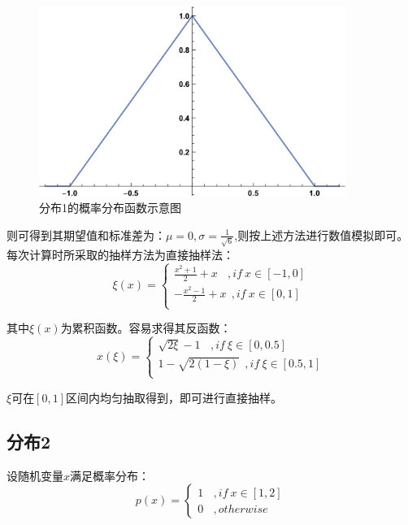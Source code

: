 \documentclass[a4paper,11pt]{article}
\begin{document}
\begin{figure}[!htbp]        
\centering
\includegraphics[width=10cm]{1.png}      
\caption{ 分布1的概率分布函数示意图}      
\end{figure}

则可得到其期望值和标准差为：$\mu = 0,\sigma = \frac{1}{\sqrt{6}}$,则按上述方法进行数值模拟即可。每次计算时所采取的抽样方法为直接抽样法：
\begin{equation}
\xi(x) = 
\left\{
\begin{array}{l}
\frac{x^{2}+1}{2}+x~~~~,if~x\in [-1,0]  \\
-\frac{x^{2}-1}{2}+x~~,if~x\in[0,1]  \\	
\end{array}
\right.
\end{equation}

其中$\xi(x)$为累积函数。容易求得其反函数：
\begin{equation}
x(\xi) = 
\left\{
\begin{array}{l}
\sqrt{2\xi}-1~~~~,if~\xi\in [0,0.5]  \\
1-\sqrt{2(1-\xi)}~~,if~\xi\in[0.5,1]  \\	
\end{array}
\right.
\end{equation}

$\xi$可在$[0,1]$区间内均匀抽取得到，即可进行直接抽样。



\subsection{分布2}
设随机变量$x$满足概率分布：
\begin{equation}
p(x) = 
\left\{
\begin{array}{l}
1~~~~,if~x\in [1,2]  \\
0~~~~,otherwise	
\end{array}
\right.
\end{equation}
\end{document}
